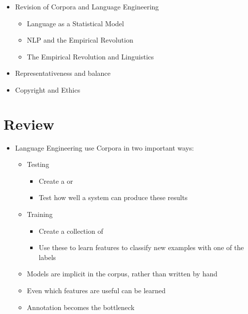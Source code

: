 \documentclass[a4paper,landscape,headrule,footrule,xetex]{foils}
\begin{document}

\maketitle



\begin{itemize} 
\item Revision of Corpora and Language Engineering
  \begin{itemize}
  \item Language as a Statistical Model
  \item NLP and the Empirical Revolution
  \item The Empirical Revolution and Linguistics
  \end{itemize}
\item Representativeness and balance
\item Copyright and Ethics
\end{itemize}


\section{Review}



\begin{itemize}
\item Language Engineering use Corpora in two important ways:
  \begin{itemize}
  \item Testing
    \begin{itemize}
    \item Create a  or 
    \item Test how well a system can produce these results
    \end{itemize}
  \item Training
   \begin{itemize}
    \item Create a collection of 
    \item Use these to learn features to classify new examples with
      one of the labels
    \end{itemize}

  \item Models are implicit in the corpus, rather than written by hand
  \item Even which features are useful can be learned
  \item Annotation becomes the bottleneck
  \end{itemize}
\end{itemize}
\end{document}
